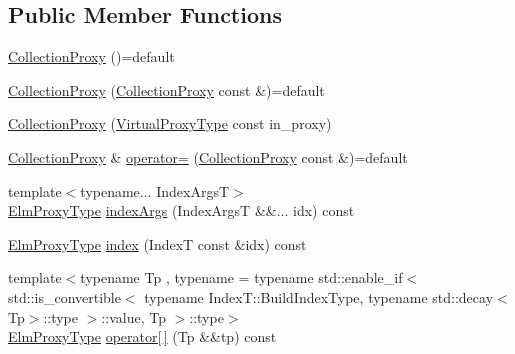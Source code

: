 \subsection*{Public Member Functions}
\begin{DoxyCompactItemize}
\item 
\hyperlink{structvt_1_1vrt_1_1collection_1_1_collection_proxy_a5cc052678774abc3b4811f273f0df405}{Collection\+Proxy} ()=default
\item 
\hyperlink{structvt_1_1vrt_1_1collection_1_1_collection_proxy_ae9e5efa3735abd08a7b3d68375447f92}{Collection\+Proxy} (\hyperlink{structvt_1_1vrt_1_1collection_1_1_collection_proxy}{Collection\+Proxy} const \&)=default
\item 
\hyperlink{structvt_1_1vrt_1_1collection_1_1_collection_proxy_ac4762724e6b3c028f183b42f635d69ce}{Collection\+Proxy} (\hyperlink{namespacevt_a1b417dd5d684f045bb58a0ede70045ac}{Virtual\+Proxy\+Type} const in\+\_\+proxy)
\item 
\hyperlink{structvt_1_1vrt_1_1collection_1_1_collection_proxy}{Collection\+Proxy} \& \hyperlink{structvt_1_1vrt_1_1collection_1_1_collection_proxy_ab70ea05660c740600207b58db48cc4f6}{operator=} (\hyperlink{structvt_1_1vrt_1_1collection_1_1_collection_proxy}{Collection\+Proxy} const \&)=default
\item 
{\footnotesize template$<$typename... Index\+ArgsT$>$ }\\\hyperlink{structvt_1_1vrt_1_1collection_1_1_collection_proxy_a892c21eae1dca37321d7973f72b55b0a}{Elm\+Proxy\+Type} \hyperlink{structvt_1_1vrt_1_1collection_1_1_collection_proxy_a0119b05e9284408d0b6dfc8fc47b12d6}{index\+Args} (Index\+ArgsT \&\&... idx) const
\item 
\hyperlink{structvt_1_1vrt_1_1collection_1_1_collection_proxy_a892c21eae1dca37321d7973f72b55b0a}{Elm\+Proxy\+Type} \hyperlink{structvt_1_1vrt_1_1collection_1_1_collection_proxy_a9dcc562f78ac9f7dbef426c33c3b6f53}{index} (IndexT const \&idx) const
\item 
{\footnotesize template$<$typename Tp , typename  = typename std\+::enable\+\_\+if$<$      std\+::is\+\_\+convertible$<$        typename Index\+T\+::\+Build\+Index\+Type, typename std\+::decay$<$\+Tp$>$\+::type      $>$\+::value, Tp    $>$\+::type$>$ }\\\hyperlink{structvt_1_1vrt_1_1collection_1_1_collection_proxy_a892c21eae1dca37321d7973f72b55b0a}{Elm\+Proxy\+Type} \hyperlink{structvt_1_1vrt_1_1collection_1_1_collection_proxy_aadaff277615aa5f7b051a6387e695e16}{operator\mbox{[}$\,$\mbox{]}} (Tp \&\&tp) const

\end{DoxyCompactItemize}
